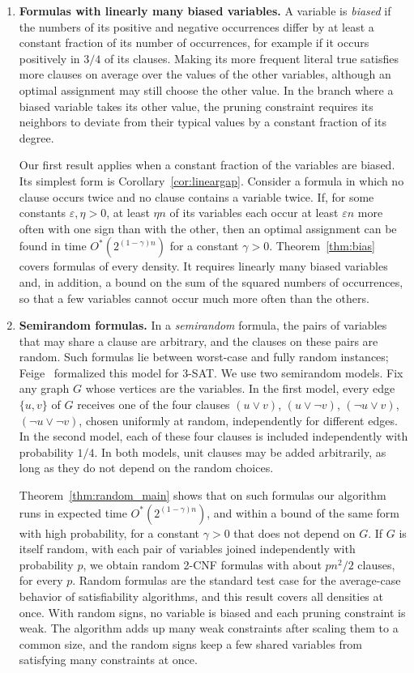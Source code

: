 \documentclass[11pt,a4paper]{article}
\theoremstyle{definition}
\theoremstyle{remark}
\newcommand{\Ostar}{O^{*}}
\begin{document}
\begin{enumerate}
\item \textbf{Formulas with linearly many biased variables.}
A variable is \emph{biased} if the numbers of its positive and negative
occurrences differ by at least a constant fraction of its number of
occurrences, for example if it occurs positively in $3/4$ of its
clauses. Making its more frequent literal true satisfies more clauses on
average over the values of the other variables, although an optimal
assignment may still choose the other value. In the branch where a biased
variable takes its other value, the pruning constraint requires its
neighbors to deviate from their typical values by a constant fraction of
its degree.

Our first result applies when a constant fraction of the variables are
biased. Its simplest form is Corollary~\ref{cor:lineargap}. Consider a
formula in which no clause occurs twice and no clause contains a variable
twice. If, for some constants $\varepsilon,\eta>0$, at least $\eta n$ of
its variables each occur at least $\varepsilon n$ more often with one sign
than with the other, then an optimal assignment can be found in time
$\Ostar(2^{(1-\gamma)n})$ for a constant $\gamma>0$.
Theorem~\ref{thm:bias} covers formulas of every density. It requires
linearly many biased variables and, in addition, a bound on the sum of the
squared numbers of occurrences, so that a few variables cannot occur much
more often than the others.

\item \textbf{Semirandom formulas.}
In a \emph{semirandom} formula, the pairs of variables that may share a
clause are arbitrary, and the clauses on these pairs are random. Such
formulas lie between worst-case and fully random instances;
Feige~\cite{feige2007refuting} formalized this model for 3-SAT. We use two
semirandom models. Fix any graph $G$ whose vertices are the variables. In
the first model, every edge $\{u,v\}$ of $G$ receives one of the four
clauses $(u\vee v)$, $(u\vee\neg v)$, $(\neg u\vee v)$, $(\neg u\vee\neg v)$,
chosen uniformly at random, independently for different edges. In the
second model, each of these four clauses is included independently with
probability $1/4$. In both models, unit clauses may be added arbitrarily,
as long as they do not depend on the random choices.

Theorem~\ref{thm:random_main} shows that on such formulas our algorithm
runs in expected time $\Ostar(2^{(1-\gamma)n})$, and within a bound of
the same form with high probability, for a constant $\gamma>0$ that does
not depend on $G$. If $G$ is itself random, with
each pair of variables joined independently with probability $p$, we
obtain random 2-CNF formulas with about $pn^2/2$ clauses, for every $p$.
Random formulas are the standard test case for the average-case behavior
of satisfiability algorithms, and this result covers all densities at once.
With random signs, no variable is biased and each pruning constraint is
weak. The algorithm adds up many weak constraints after scaling them to a
common size, and the random signs keep a few shared variables from
satisfying many constraints at once.


\end{enumerate}
\end{document}
